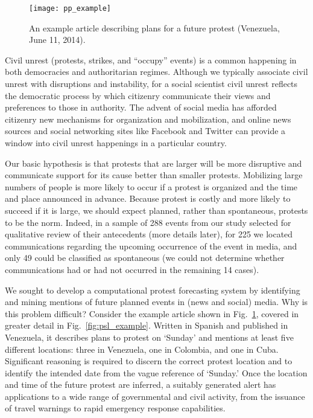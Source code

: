 \begin{figure}
    \texttt{[image: pp\_example]}
    \caption{An example article describing plans for a future protest (Venezuela, June 11, 2014).}
    \vspace{-2em}
    \label{pp_example}
\end{figure}
Civil unrest (protests, strikes, and ``occupy'' events) is a common happening in both democracies
and authoritarian regimes.
Although we typically associate civil unrest with disruptions and instability, for a social scientist
civil unrest reflects the democratic process by 
which citizenry communicate their views and preferences to those in authority. 
The advent of social
media has afforded citizenry new mechanisms for organization and mobilization, and online news sources
and social networking sites like Facebook and Twitter
can provide a window into civil unrest happenings in a particular country.

Our basic hypothesis is that
protests that are larger will be more disruptive and communicate support for its cause better than smaller protests. 
Mobilizing large numbers of people is more likely to occur if a protest is organized and the time and place announced in
advance. Because protest is costly and more likely to succeed if it is large, we should expect planned, rather than 
spontaneous, protests to be the norm. Indeed, in a sample of 288 events from our study selected for qualitative review of their antecedents
(more details later), for 225 we located communications regarding the upcoming occurrence of the event in media, and only 49 could be classified as 
spontaneous (we could not determine whether communications had or had not occurred in the remaining 14 cases).

We sought to develop
a computational protest forecasting system by
identifying and mining mentions of future planned events
in (news and social) media.  
Why is this problem difficult? Consider the example article shown in Fig.~\ref{pp_example},
covered in greater detail in Fig.~\ref{fig:psl_example}. Written in Spanish and published in Venezuela, it describes plans 
to protest on `Sunday' and mentions at least five different locations: three in Venezuela, one in Colombia, and one in Cuba. 
Significant reasoning is required to discern the correct protest location and to identify the intended date
from the vague reference of `Sunday.' Once the location and time of the future
protest are inferred, a suitably generated alert has applications to a wide range of 
governmental and civil activity, from the issuance of travel warnings
to rapid emergency response capabilities.  

